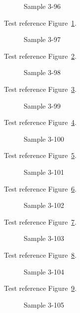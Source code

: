 \begin{figure}[tbhp]
\caption{Sample 3-96}
\label{fig:sample-3-96}
\end{figure}

Test reference Figure~\ref{fig:sample-3-96}.

\begin{figure}[tbhp]
\caption{Sample 3-97}
\label{fig:sample-3-97}
\end{figure}

Test reference Figure~\ref{fig:sample-3-97}.

\begin{figure}[tbhp]
\caption{Sample 3-98}
\label{fig:sample-3-98}
\end{figure}

Test reference Figure~\ref{fig:sample-3-98}.

\begin{figure}[tbhp]
\caption{Sample 3-99}
\label{fig:sample-3-99}
\end{figure}

Test reference Figure~\ref{fig:sample-3-99}.

\begin{figure}[tbhp]
\caption{Sample 3-100}
\label{fig:sample-3-100}
\end{figure}

Test reference Figure~\ref{fig:sample-3-100}.

\begin{figure}[tbhp]
\caption{Sample 3-101}
\label{fig:sample-3-101}
\end{figure}

Test reference Figure~\ref{fig:sample-3-101}.

\begin{figure}[tbhp]
\caption{Sample 3-102}
\label{fig:sample-3-102}
\end{figure}

Test reference Figure~\ref{fig:sample-3-102}.

\begin{figure}[tbhp]
\caption{Sample 3-103}
\label{fig:sample-3-103}
\end{figure}

Test reference Figure~\ref{fig:sample-3-103}.

\begin{figure}[tbhp]
\caption{Sample 3-104}
\label{fig:sample-3-104}
\end{figure}

Test reference Figure~\ref{fig:sample-3-104}.

\begin{figure}[tbhp]
\caption{Sample 3-105}
\label{fig:sample-3-105}
\end{figure}

